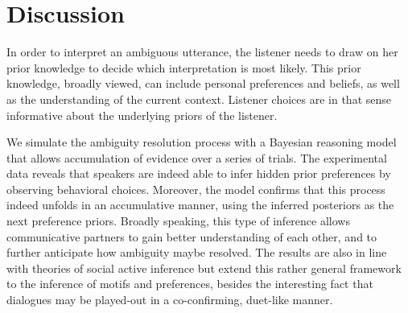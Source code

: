 \documentclass[10pt,a4paper]{article}
\begin{document}
%

\section{Discussion}

In order to interpret an ambiguous utterance, the listener needs to draw on her prior knowledge to decide which interpretation is most likely. This prior knowledge, broadly viewed, can include personal preferences and beliefs, as well as the understanding of the current context. Listener choices are in that sense informative about the underlying priors of the listener. 

We simulate the ambiguity resolution process with a Bayesian reasoning model that allows accumulation of evidence over a series of trials. The experimental data reveals that speakers are indeed able to infer hidden prior preferences by observing behavioral choices. Moreover, the model confirms that this process indeed unfolds in an accumulative manner, using the inferred posteriors as the next preference priors. 
Broadly speaking, this type of inference allows communicative partners to gain better understanding of each other, and to further anticipate how ambiguity maybe resolved.
The results are also in line with theories of social active inference \cite{Friston:2015b} but extend this rather general framework to the inference of motifs and preferences, besides the interesting fact that dialogues may be played-out in a co-confirming, duet-like manner. 
\end{document}
